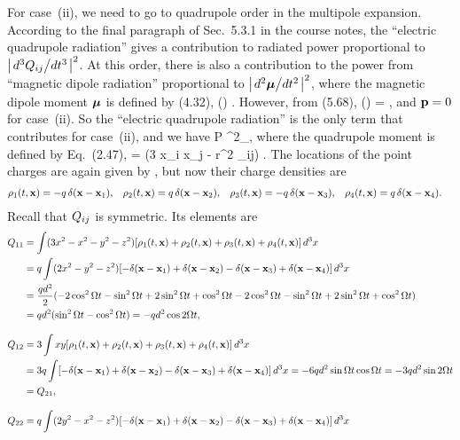 \begin{solution}
	For case~(ii), we need to go to quadrupole order in the multipole expansion.  According to the final paragraph of Sec.~5.3.1 in the course notes, the ``electric quadrupole radiation'' gives a contribution to radiated power proportional to $\abs{\dv*[3]{Q_{ij}}{t}}^2$.  At this order, there is also a contribution to the power from ``magnetic dipole radiation'' proportional to $\abs{\dv*[2]{\boldsymbol{\mu}}{t}}^2$, where the magnetic dipole moment $\boldsymbol{\mu}$ is defined by (4.32),
	\beq
		\vvmu \equiv {} \int \vx \cross \vJ(\vx) \dcx.
	\eeq
	However, from (5.68),
	\beq
		\int \vJ(\vx) \dcx = ,
	\eeq
	and $\vb{p} = 0$ for case~(ii).  So the ``electric quadrupole radiation'' is the only term that contributes for case~(ii), and we have
	\beq
		P \propto {}^2_\ret,
	\eeq
	where the quadrupole moment is defined by Eq.~(2.47),
	\beq
		\Qij = \int (3 x_i x_j - r^2 \del_{ij}) \rho \dcx.
	\eeq
	The locations of the point charges are again given by , but now their charge densities are
	\begin{align*}
		\rho_1(t, \vb{x}) &= -q \, \delta(\vb{x} - \vb{x}_1), &
		\rho_2(t, \vb{x}) &= q \, \delta(\vb{x} - \vb{x}_2), &
		\rho_3(t, \vb{x}) &= -q \, \delta(\vb{x} - \vb{x}_3), &
		\rho_4(t, \vb{x}) &= q \, \delta(\vb{x} - \vb{x}_4).
	\end{align*}
	Recall that $Q_{ij}$ is symmetric.  Its elements are
	\begin{align*}
		\Qqq &= \int (3 x^2 - x^2 - y^2 - z^2) [ \rhoq(t, \vx) + \rhow(t, \vx) + \rhoe(t, \vx) + \rhor(t, \vx) ] \dcx \\
		&= q \int (2 x^2 - y^2 - z^2) [ -\delta(\vx - \vxq) + \delta(\vx - \vxw) - \delta(\vx - \vxe) + \delta(\vx - \vxr) ] \dcx \\
		&= \frac{q d^2}{2} (-2 \cos^2 \Omg t - \sin^2 \Omg t + 2 \sin^2 \Omg t + \cos^2 \Omg t - 2 \cos^2 \Omg t - \sin^2 \Omg t + 2 \sin^2 \Omg t + \cos^2 \Omg t) \\
		&= q d^2 (\sin^2 \Omg t - \cos^2 \Omg t)
		= -q d^2 \cos 2\Omg t, \\[2ex]
		Q_{12} & = 3 \int xy [ \rhoq(t, \vx) + \rhow(t, \vx) + \rhoe(t, \vx) + \rhor(t, \vx) ] \dcx \\
		&= 3q \int [ -\delta(\vx - \vxq) + \delta(\vx - \vxw) - \delta(\vx - \vxe) + \delta(\vx - \vxr) ] \dcx
		= -6 q d^2 \sin \Omg t \cos \Omg t
		= -3 q d^2 \sin 2\Omg t \\
		&= Q_{21}, \\[2ex]
		Q_{22} &= q \int (2 y^2 - x^2 - z^2) [ -\delta(\vx - \vxq) + \delta(\vx - \vxw) - \delta(\vx - \vxe) + \delta(\vx - \vxr) ] \dcx

\end{align*}
\end{solution}

